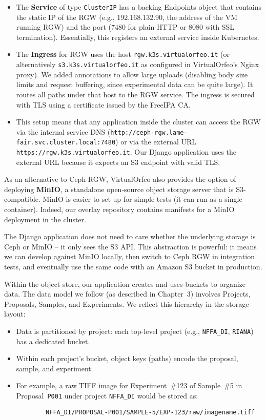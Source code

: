 \begin{itemize}
	\item The \textbf{Service} of type \texttt{ClusterIP} has a backing Endpoints 
	object that contains the static IP of the RGW (e.g., 192.168.132.90, the 
	address of the VM running RGW) and the port (7480 for plain HTTP or 8080 with 
	SSL termination). Essentially, this registers an external service inside 
	Kubernetes.  
	\item The \textbf{Ingress} for RGW uses the host \texttt{rgw.k3s.virtualorfeo.it} 
	(or alternatively \texttt{s3.k3s.virtualorfeo.it} as configured in 
	VirtualOrfeo’s Nginx proxy). We added annotations to allow large uploads 
	(disabling body size limits and request buffering, since experimental data can 
	be quite large). It routes all paths under that host to the RGW service. The 
	ingress is secured with TLS using a certificate issued by the FreeIPA CA.  
	\item This setup means that any application inside the cluster can access the 
	RGW via the internal service DNS 
	(\texttt{http://ceph-rgw.lame-fair.svc.cluster.local:7480}) or via the 
	external URL \texttt{https://rgw.k3s.virtualorfeo.it}. Our Django application 
	uses the external URL because it expects an S3 endpoint with valid TLS.  
\end{itemize}

\medskip

As an alternative to Ceph RGW, VirtualOrfeo also provides the option of deploying 
\textbf{MinIO}, a standalone open-source object storage server that is 
S3-compatible. MinIO is easier to set up for simple tests (it can run as a 
single container). Indeed, our overlay repository contains manifests for a MinIO 
deployment in the cluster.  

The Django application does not need to care whether the underlying storage is 
Ceph or MinIO – it only sees the S3 API. This abstraction is powerful: it means 
we can develop against MinIO locally, then switch to Ceph RGW in integration 
tests, and eventually use the same code with an Amazon S3 bucket in production.

\medskip

Within the object store, our application creates and uses buckets to organize 
data. The data model we follow (as described in Chapter~3) involves Projects, 
Proposals, Samples, and Experiments. We reflect this hierarchy in the storage 
layout:  

\begin{itemize}
	\item Data is partitioned by project: each top-level project 
	(e.g., \texttt{NFFA\_DI}, \texttt{RIANA}) has a dedicated bucket.  
	\item Within each project’s bucket, object keys (paths) encode the proposal, 
	sample, and experiment.  
	\item For example, a raw TIFF image for Experiment~\#123 of Sample~\#5 in 
	Proposal~\texttt{P001} under project \texttt{NFFA\_DI} would be stored as:  
	\begin{verbatim}
		NFFA_DI/PROPOSAL-P001/SAMPLE-5/EXP-123/raw/imagename.tiff
	\end{verbatim}
\end{itemize}

